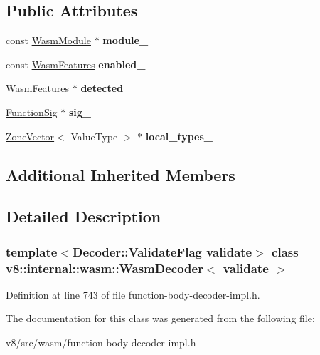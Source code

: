 \subsection*{Public Attributes}
\begin{DoxyCompactItemize}
\item 
\mbox{\label{classv8_1_1internal_1_1wasm_1_1WasmDecoder_a159591d34222d385174d62010bf6649d}} 
const \mbox{\hyperlink{structv8_1_1internal_1_1wasm_1_1WasmModule}{Wasm\+Module}} $\ast$ {\bfseries module\+\_\+}
\item 
\mbox{\label{classv8_1_1internal_1_1wasm_1_1WasmDecoder_a802852d847e2285c2937508730bbd315}} 
const \mbox{\hyperlink{structv8_1_1internal_1_1wasm_1_1WasmFeatures}{Wasm\+Features}} {\bfseries enabled\+\_\+}
\item 
\mbox{\label{classv8_1_1internal_1_1wasm_1_1WasmDecoder_aa169e7c65a182a7e8a8592ad1be89a56}} 
\mbox{\hyperlink{structv8_1_1internal_1_1wasm_1_1WasmFeatures}{Wasm\+Features}} $\ast$ {\bfseries detected\+\_\+}
\item 
\mbox{\label{classv8_1_1internal_1_1wasm_1_1WasmDecoder_a84ff2d151eeced4e96b8612dfa9fd998}} 
\mbox{\hyperlink{classv8_1_1internal_1_1Signature}{Function\+Sig}} $\ast$ {\bfseries sig\+\_\+}
\item 
\mbox{\label{classv8_1_1internal_1_1wasm_1_1WasmDecoder_aaa393457bd3d83fc105a7a9632a762d1}} 
\mbox{\hyperlink{classv8_1_1internal_1_1ZoneVector}{Zone\+Vector}}$<$ Value\+Type $>$ $\ast$ {\bfseries local\+\_\+types\+\_\+}
\end{DoxyCompactItemize}
\subsection*{Additional Inherited Members}


\subsection{Detailed Description}
\subsubsection*{template$<$Decoder\+::\+Validate\+Flag validate$>$\newline
class v8\+::internal\+::wasm\+::\+Wasm\+Decoder$<$ validate $>$}



Definition at line 743 of file function-\/body-\/decoder-\/impl.\+h.



The documentation for this class was generated from the following file\+:\begin{DoxyCompactItemize}
\item 
v8/src/wasm/function-\/body-\/decoder-\/impl.\+h\end{DoxyCompactItemize}
